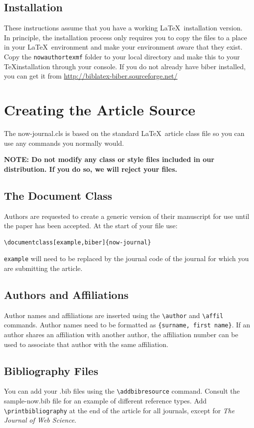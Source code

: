 \documentclass[example,biber]{now-journal} %
\begin{document}
\subsection{Installation}
These instructions assume that you have a working \LaTeX\ installation version. In principle, the installation process only requires you to copy the files to a place in your \LaTeX\ environment and make your environment aware that they exist. Copy the \texttt{nowauthortexmf} folder to your local directory and make this to your \TeX installation through your console. If you do not already have biber installed, you can get it from \url{http://biblatex-biber.sourceforge.net/}

\section{Creating the Article Source} 
\label{s-source}
The now-journal.cls is based on the standard \LaTeX\ article class file so you can use any commands you normally would.

\textbf{NOTE: Do not modify any class or style files included in our distribution. If you do so, we will reject your files.}

\subsection{The Document Class}
Authors are requested to create a generic version of their manuscript for use until the paper has been accepted. At the start of your file use:

\begin{verbatim}
\documentclass[example,biber]{now-journal}
\end{verbatim}

\texttt{example} will need to be replaced by the journal code of the journal for which you are submitting the article.

\subsection{Authors and Affiliations}
Author names and affiliations are inserted using the \texttt{\textbackslash author} and \texttt{\textbackslash affil} commands. Author names need to be formatted as \texttt{\{surname, first name\}}. If an author shares an affiliation with another author, the affiliation number can be used to associate that author with the same affiliation. 

\subsection{Bibliography Files}
You can add your .bib files using the \texttt{\textbackslash addbibresource} command. Consult the sample-now.bib file for an example
of different reference types. Add \texttt{\textbackslash printbibliography} at the end of the article for all journals, except for \textit{The Journal of Web Science}.
\end{document}
